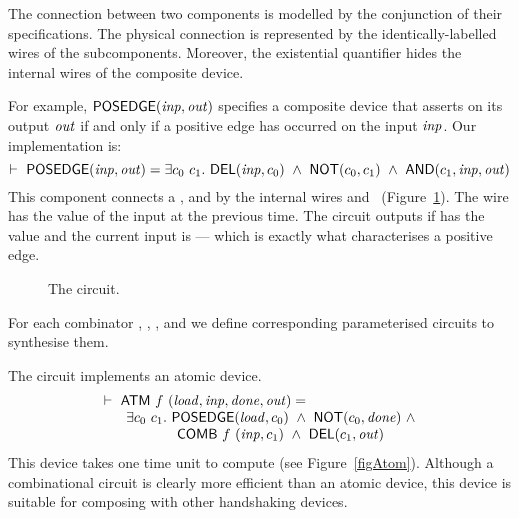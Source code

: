 \documentclass{llncs}
\begin{document}
The connection between two components is modelled
by the conjunction of their specifications.
The physical connection is represented by
the identically-labelled wires of the subcomponents.
Moreover,  the existential quantifier hides the 
internal wires of the composite device.

For example, $\mathsf{POSEDGE}(\mathit{inp},\mathit{out})$ specifies a composite
device that asserts  on its output $\mathit{out}$ if and only if a positive edge
has occurred on the input $\mathit{inp}$. Our implementation is:
\[
\TURNST\ \DEF{POSEDGE} (\VAR{inp},\VAR{out}) = 
    \exists c_0~ c_1.\ \DEF{DEL} (\VAR{inp},c_0)\ \AND\
                  \DEF{NOT} (c_0, c_1)\ \AND\ \DEF{AND} (c_1,\VAR{inp},\VAR{out})
\]
This component connects a ,  and 
by the internal wires  and~ (Figure~\ref{figPosedge}).
The wire  has the value of the
input at the previous time. The circuit outputs  if
\sVAR{c}{0} has the value  and the current input is  ---
which is exactly what characterises a positive edge.
\begin{figure}[htb]
   \centerline{}
   \caption{\label{figPosedge}The  circuit.}
\end{figure}



For each combinator , , ,
 and  we define corresponding
parameterised circuits to synthesise them.

The circuit  implements an atomic device.
\[
\begin{array}{l}
\TURNST\ \DEF{ATM}\ f\ (\VAR{load,inp,done,out}) =\\
\phantom{\TURNST\ ~~}    \exists c_0~ c_1.\ \DEF{POSEDGE} (\VAR{load}, c_0)\ \AND \ 
\DEF{NOT} (c_0, \VAR{done})\ \AND\\
\phantom{\TURNST\ ~~\exists c_0, c_1.\ }  \DEF{COMB}\ f\ (\VAR{inp},c_1)\ \AND\ \DEF{DEL} (c_1,\VAR{out})
\end{array}
\]
This device takes one time unit to compute (see Figure~\ref{figAtom}).
Although a combinational circuit is 
clearly more efficient than an atomic device,
this device is suitable for composing with other
handshaking devices.
\end{document}
